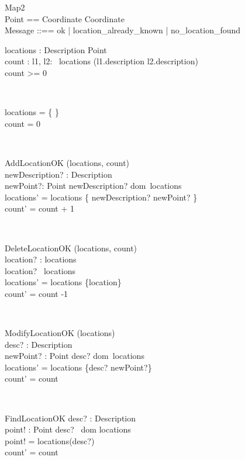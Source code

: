 \documentclass[12pt]{article}
\begin{document}
\begin{spacing}{1.5}
\begin{class}{Map2}
 \\
Point == Coordinate \times Coordinate \\
Message ::== ok | location\_already\_known | no\_location\_found \\
\begin{state}
locations : Description \pfun Point\\
count : 
\where
\forall l1, l2: ~locations \bullet (l1.description \neq l2.description) \\
count >= 0
\end{state} \\
\begin{init}
locations = \{ \} \\
count = 0
\end{init} \\
\begin{op}{AddLocationOK}
\Delta (locations, count) \\
newDescription? : Description\\
newPoint?: Point 
\ST
newDescription? \notin dom~locations \\
locations' = locations \cup \{ newDescription? \to newPoint? \} \\
count' = count + 1
\end{op}\\
\begin{op}{DeleteLocationOK}
\Delta (locations, count) \\
location? : locations\\
\ST
location? \in ~locations\\
locations' = locations \setminus \{location\} \\
count' = count -1
\end{op}\\
\begin{op}{ModifyLocationOK}
\Delta (locations) \\
desc? : Description\\
newPoint? : Point
\ST
desc? \in dom~locations \\
locations' = locations \oplus \{desc? \to newPoint?\} \\
count' = count
\end{op}\\ 
\begin{op}{FindLocationOK}
desc? : Description\\
point! : Point
\ST
desc? \in ~dom locations \\
point! = locations(desc?) \\
count' = count
\end{op}\\


\end{class}
\end{spacing}
\end{document}
